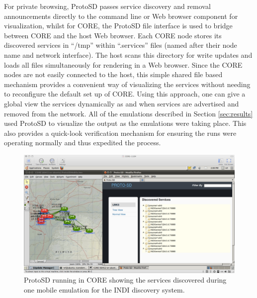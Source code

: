 For private browsing, ProtoSD passes service discovery and removal announcements directly to the command line or Web browser component for visualization, whilst for CORE, the ProtoSD file interface is used to bridge between CORE and the host Web browser.    Each CORE node stores its discovered services  in ``/tmp'' within ``.services'' files (named after their node name and network interface). The host scans this directory for write updates and loads all files simultaneously for rendering in a Web browser. Since the CORE nodes are not easily connected to the host, this simple shared file based mechanism provides a convenient way of visualizing the services without needing to reconfigure the default set up of CORE.   Using this approach, one can give a global view the services dynamically as and when services are advertised and removed from the network.  All of the emulations described in Section \ref{sec:results} used ProtoSD to visualize the output as the emulations were taking place.  This also provides a quick-look verification mechanism for ensuring the runs were operating normally and thus expedited the process.   

\begin{figure}[h!]
\centering
\includegraphics[width=5.5in]{ProtoSDCore.pdf}
\caption{ProtoSD running in CORE showing the services discovered during one mobile emulation for the INDI discovery system.} 
\label{indi:protosdcore}
\end{figure}

